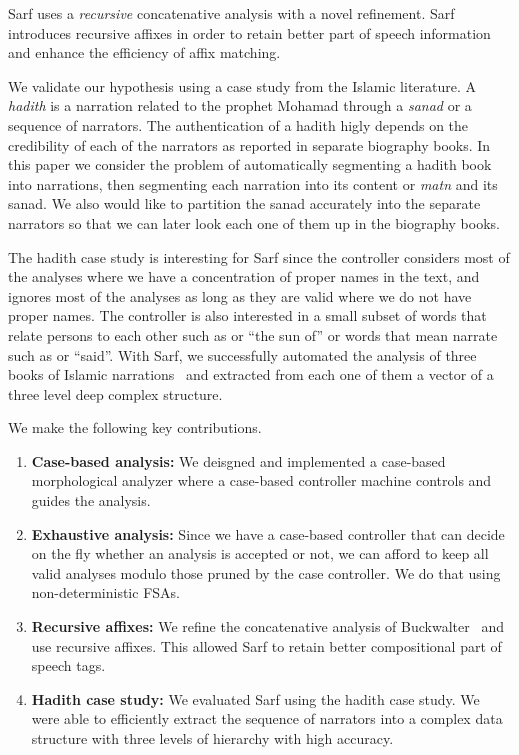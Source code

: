 \documentclass[11pt,letterpaper]{article}
\begin{document}
Sarf uses a {\em recursive} concatenative analysis with a novel 
refinement. 
Sarf introduces recursive affixes in order to
retain better part of speech information and enhance the 
efficiency of affix matching. 

We validate our hypothesis using a case study from the Islamic 
literature. 
A {\em hadith} is a narration related to the prophet Mohamad
through a {\em sanad} or a sequence of narrators. 
The authentication of a hadith higly depends on the credibility
of each of the narrators as reported in separate biography 
books. 
In this paper we consider the problem of automatically segmenting
a hadith book into narrations, then segmenting each narration into
its content or {\em matn} and its sanad.
We also would like to partition the sanad accurately into the 
separate narrators so that we can later look each one of them 
up in the biography books. 

The hadith case study is interesting for Sarf since the controller
considers most of the analyses where we have a concentration
of proper names in the text, and ignores most of the analyses as long 
as they are valid where we do not have proper names. 
The controller is also interested in a small subset of words 
that relate persons to each other such as  or ``the sun of''
or words that mean narrate such as  or ``said''. 
With Sarf, we successfully automated the analysis of 
three books of Islamic narrations~\cite{IbnHanbal,AlTousi,AlKulayni}
and extracted from each one of them a vector of a three level deep
complex structure. 


We make the following key contributions. 
\begin{enumerate}
\item {\bf Case-based analysis:}  We deisgned and implemented
a case-based morphological analyzer where a case-based controller
machine controls and guides the analysis. 
\item {\bf Exhaustive analysis:} Since we have a case-based 
controller that can decide on the fly whether an analysis is 
accepted or not, we can afford to keep all valid analyses modulo
those pruned by the case controller. 
We do that using non-deterministic FSAs. 
\item {\bf Recursive affixes:}
We refine the concatenative analysis of 
Buckwalter~  and use recursive affixes. 
This allowed Sarf to retain better compositional part of speech
tags.
\item {\bf Hadith case study:}
We evaluated Sarf using the hadith case study. We were able to
efficiently extract the sequence of narrators into a complex
data structure with three levels of hierarchy with high accuracy. 
\end{enumerate}
\end{document}
